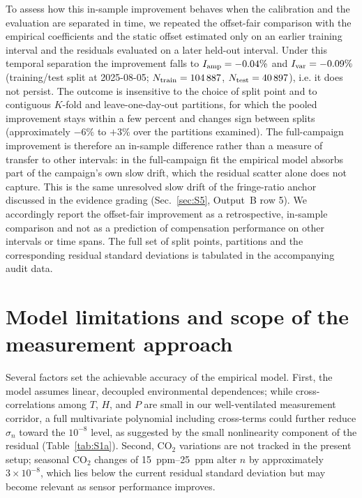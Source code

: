 \documentclass[aps,prapplied,reprint,superscriptaddress]{revtex4-2}
\begin{document}
To assess how this in-sample improvement behaves when the calibration and the evaluation are separated in time, we repeated the offset-fair comparison with the empirical coefficients and the static offset estimated only on an earlier training interval and the residuals evaluated on a later held-out interval. Under this temporal separation the improvement falls to $I_{\rm amp} = -0.04\%$ and $I_{\rm var} = -0.09\%$ (training/test split at 2025-08-05; $N_{\rm train} = 104\,887$, $N_{\rm test} = 40\,897$), i.e. it does not persist. The outcome is insensitive to the choice of split point and to contiguous $K$-fold and leave-one-day-out partitions, for which the pooled improvement stays within a few percent and changes sign between splits (approximately $-6\%$ to $+3\%$ over the partitions examined). The full-campaign improvement is therefore an in-sample difference rather than a measure of transfer to other intervals: in the full-campaign fit the empirical model absorbs part of the campaign's own slow drift, which the residual scatter alone does not capture. This is the same unresolved slow drift of the fringe-ratio anchor discussed in the evidence grading (Sec.~\ref{sec:S5}, Output~B row 5). We accordingly report the offset-fair improvement as a retrospective, in-sample comparison and not as a prediction of compensation performance on other intervals or time spans. The full set of split points, partitions and the corresponding residual standard deviations is tabulated in the accompanying audit data.

\section{Model limitations and scope of the measurement approach}
\label{sec:S4}

Several factors set the achievable accuracy of the empirical model. First, the model assumes linear, decoupled environmental dependences; while cross-correlations among $T$, $H$, and $P$ are small in our well-ventilated measurement corridor, a full multivariate polynomial including cross-terms could further reduce $\sigma_n$ toward the $10^{-8}$ level, as suggested by the small nonlinearity component of the residual (Table~\ref{tab:S1a}). Second, CO$_2$ variations are not tracked in the present setup; seasonal CO$_2$ changes of \SIrange{15}{25}{ppm} alter $n$ by approximately $3 \times 10^{-8}$, which lies below the current residual standard deviation but may become relevant as sensor performance improves.
\end{document}
